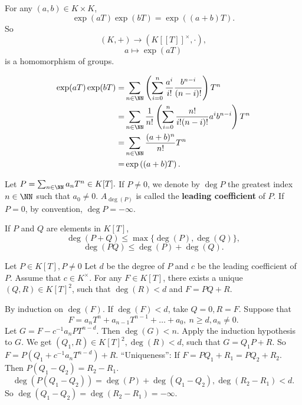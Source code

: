 \begin{propositionenv}
    For any $(a,b)\in K\times K$, 
    $$\exp(aT)\exp(bT)=\exp\left((a+b)T\right).$$ 
    So 
    $$(K,+)\longrightarrow (K[\![T]\!]^\times, \cdot),$$
    $$a\longmapsto \exp(aT)$$
    is a homomorphism of groups.
\end{propositionenv}
\begin{proofenv}
    \begin{align*}
        \exp(aT)\exp(bT)=&\sum_{n\in\NN}\left(\sum_{i=0}^{n}\frac{a^i}{i!}\frac{b^{n-i}}{(n-i)!}\right)T^n\\
        =&\sum_{n\in\NN}\frac{1}{n!}\left(\sum_{i=0}^{n}\frac{n!}{i!(n-i)!}a^ib^{n-i}\right)T^n\\
        =&\sum_{n\in\NN}\frac{(a+b)^n}{n!}T^n\\
        =&\exp\left((a+b)T\right).
    \end{align*}
\end{proofenv}
\begin{definitionenv}
    Let $P=\sum_{n\in\NN}a_nT^n\in K[T].$ If $P\not=0$, we denote by $\deg P$ the greatest index $n\in \NN$ such that $a_0\not=0$. $A_{\deg(P)}$ is called the \textbf{leading coefficient} of $P$. If $P=0$, by convention, $\deg P=-\infty$.
\end{definitionenv}
\begin{propositionenv}
    If $P$ and $Q$ are elements in $K[T]$, 
    $$\deg(P+Q)\le \max\{\deg(P),\deg(Q)\},$$
    $$\deg(PQ)\le\deg(P)+\deg(Q).$$
\end{propositionenv}
\begin{theoremenv}
    Let $P\in K[T], P\not=0$ Let $d$ be the degree of $P$ and $c$ be the leading coefficient of $P$. Assume that $c\in K^\times$. For any $F\in K[T]$, there exists a unique $(Q,R)\in K[T]^2$, such that $\deg(R)<d$ and $F=PQ+R$. 
\end{theoremenv}
\begin{proofenv}
    By induction on $\deg (F)$. If $\deg(F)<d$, take $Q=0,R=F$. Suppose that
    $$F=a_nT^n+a_{n-1}T^{n-1}+\dots+a_0, \ n\ge d, a_n\not=0.$$
    Let $G=F-c^{-1}a_nPT^{n-d}$. Then $\deg(G)<n$. Apply the induction hypothesis to $G$. We get $(Q_1,R)\in K[T]^2, \deg(R)<d$, such that $G=Q_1P+R$. So $F=P(Q_1+c^{-1}a_nT^{n-d})+R$.
    \newline
    ``Uniqueness'': If $F=PQ_1+R_1=PQ_2+R_2$. Then $P(Q_1-Q_2)=R_2-R_1$. 
    $$\deg(P(Q_1-Q_2))=\deg(P)+\deg(Q_1-Q_2), \deg(R_2-R_1)<d.$$
    So $\deg(Q_1-Q_2)=\deg(R_2-R_1)=-\infty.$
\end{proofenv}
